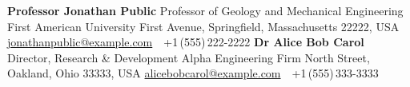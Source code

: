 \documentclass[letterpaper,MMMyyyy,nonstopmode]{./simple-resume-cv-master/simpleresumecv}
\begin{document}
\begin{Body}
\BulletItem
	\textbf{Professor Jonathan Public}
	\newline
	Professor of Geology and Mechanical Engineering
	\newline
	First American University
	 First Avenue, Springfield, Massachusetts 22222, USA
	\newline
	\href{mailto:jonathanpublic@example.com}
	{jonathanpublic@example.com}
	\,\SubBulletSymbol\,
	+1\,(555)\,222-2222
\BigGap
\BulletItem
	\textbf{Dr Alice Bob Carol}
	\newline
	Director, Research \& Development
	\newline
	Alpha Engineering Firm
	 North Street, Oakland, Ohio 33333, USA
	\newline
	\href{mailto:alicebobcarol@example.com}
	{alicebobcarol@example.com}
	\,\SubBulletSymbol\,
	+1\,(555)\,333-3333

% 
% 


\end{Body}
\end{document}
